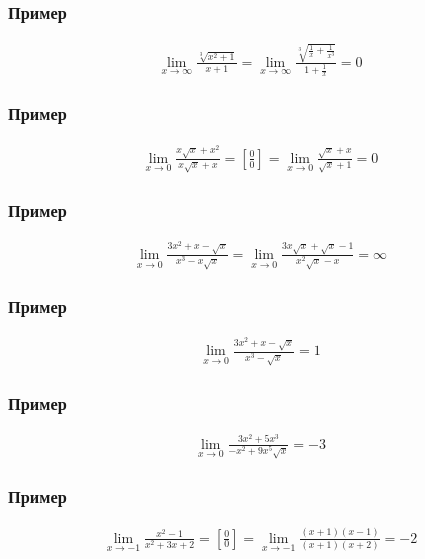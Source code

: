 \documentclass{article}
\begin{document}
\subsubsection{Пример}
\begin{gather*}
    \lim_{x \to \infty} \frac{\sqrt[3]{x^2 + 1}}{x + 1} =
    \lim_{x \to \infty} \frac{\sqrt[3]{\frac{1}{x} + \frac{1}{x^3}}}{1 + \frac{1}{x}} = 0    
\end{gather*}

\subsubsection{Пример}
\begin{gather*}
    \lim_{x \to 0} \frac{x \sqrt{x} + x^2}{x \sqrt{x} + x} = 
    \left[ \frac{0}{0} \right] =
    \lim_{x \to 0} \frac{\sqrt{x} + x}{\sqrt{x} + 1} = 0
\end{gather*}

\subsubsection{Пример}
\begin{gather*}
    \lim_{x \to 0} \frac{3x^2 + x - \sqrt{x}}{x^3 - x \sqrt{x}} =
    \lim_{x \to 0} \frac{3x \sqrt{x} + \sqrt{x} - 1}{x^2 \sqrt{x} - x} = \infty
\end{gather*}

\subsubsection{Пример}
\begin{gather*}
    \lim_{x \to 0} \frac{3x^2 + x - \sqrt{x}}{x^3 - \sqrt{x}} = 1
\end{gather*}

\subsubsection{Пример}
\begin{gather*}
    \lim_{x \to 0} \frac{3x^2 + 5x^3}{-x^2 + 9x^5 \sqrt{x}} = -3    
\end{gather*}

\subsubsection{Пример}
\begin{gather*}
    \lim_{x \to -1} \frac{x^2 - 1}{x^2 + 3x + 2} = 
    \left[ \frac{0}{0} \right] =
    \lim_{x \to -1} \frac{(x + 1)(x - 1)}{(x + 1)(x + 2)} = -2
\end{gather*}
\end{document}
